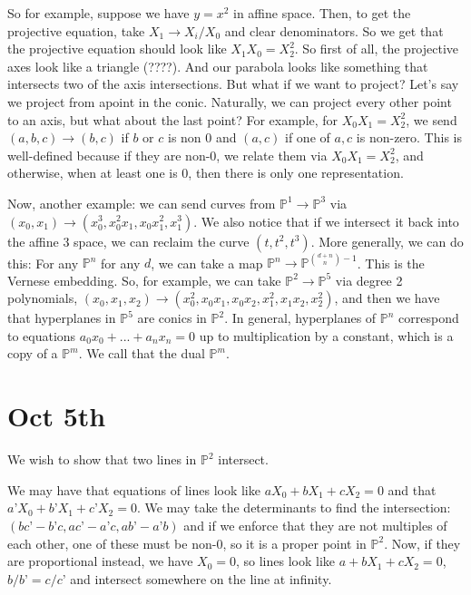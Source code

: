 \documentclass[10pt]{article}
\begin{document}
So for example, suppose we have $y = x^2$ in affine space. Then, to get the projective equation, take $X_1 \to X_i/X_0$ and clear denominators. So we get that the projective equation should look like $X_1 X_0 = X_2^2$. So first of all, the projective axes look like a triangle (????). And our parabola looks like something that intersects two of the axis intersections. But what if we want to project? Let’s say we project from apoint in the conic. Naturally, we can project every other point to an axis, but what about the last point? For example, for $X_0 X_1 = X_2^2$, we send $(a,b,c) \to (b,c)$ if $b$ or $c$ is non 0 and $(a,c)$ if one of $a,c$ is non-zero. This is well-defined because if they are non-0, we relate them via $X_0X_1 = X_2^2$, and otherwise, when at least one is $0$, then there is only one representation.

Now, another example: we can send curves from $\mathbb{P}^1 \to \mathbb{P}^3$ via $(x_0,x_1) \to (x_0^3, x_0^2x_1, x_0x_1^2,x_1^3)$. We also notice that if we intersect it back into the affine 3 space, we can reclaim the curve $(t,t^2,t^3)$. More generally, we can do this: For any $\mathbb{P}^n$ for any $d$, we can take a map $\mathbb{P}^n \to \mathbb{P}^{{d+n \choose n} -1}$. This is the Vernese embedding. So, for example, we can take $\mathbb{P}^2 \to \mathbb{P}^5$ via degree 2 polynomials, $(x_0,x_1,x_2) \to (x_0^2,x_0 x_1,x_0 x_2,x_1^2,x_1x_2,x_2^2)$, and then we have that hyperplanes in $\mathbb{P}^5$ are conics in $\mathbb{P}^2$. In general, hyperplanes of $\mathbb{P}^n$ correspond to equations $a_0x_0 + ...+ a_nx_n = 0$ up to multiplication by a constant, which is a copy of a $\mathbb{P}^m$. We call that the dual $\mathbb{P}^m$.

\section{Oct 5th}

We wish to show that two lines in $\mathbb{P}^2$ intersect. 

We may have that equations of lines look like $a X_0 + b X_1 + c X_2 = 0$ and that $a’ X_0 + b’X_1 + c’X_2 = 0$. We may take the determinants to find the intersection: $(bc’ - b’c, ac’ - a’c, ab’ - a’b)$ and if we enforce that they are not multiples of each other, one of these must be non-0, so it is a proper point in $\mathbb{P}^2$. Now, if they are proportional instead, we have $X_0 = 0$, so lines look like $a + bX_1 + cX_2 = 0$, $b/b’ = c/c’$ and intersect somewhere on the line at infinity.
\end{document}
